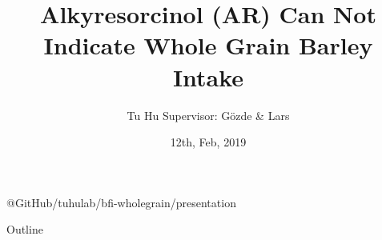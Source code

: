 \documentclass{beamer}
\title{Alkyresorcinol (AR) Can Not Indicate Whole Grain Barley Intake}
\author{Tu Hu \newline \tiny{ Supervisor: Gözde \& Lars}}
\institute{University of Copenhagen}
\date{12th, Feb, 2019}
\begin{document}
\begin{frame}
  \titlepage

  \tiny{@GitHub/tuhulab/bfi-wholegrain/presentation}
\end{frame}

\begin{frame}{Outline}
  \tableofcontents
\end{frame}
\end{document}
